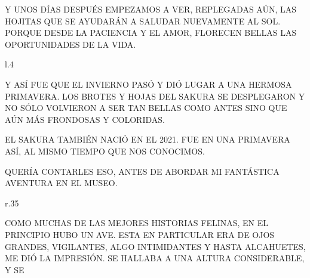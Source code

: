 Y UNOS DÍAS DESPUÉS EMPEZAMOS A VER, REPLEGADAS AÚN, LAS HOJITAS QUE SE AYUDARÁN A SALUDAR NUEVAMENTE AL SOL. PORQUE DESDE LA PACIENCIA Y EL AMOR, FLORECEN BELLAS LAS OPORTUNIDADES DE LA VIDA.
\newpage
{}
\begin{wrapfigure}[13]{l}{.4\textwidth}\vspace{-2cm}\hspace{-3cm}
\end{wrapfigure}
Y ASÍ FUE QUE EL INVIERNO PASÓ Y DIÓ LUGAR A UNA HERMOSA PRIMAVERA. LOS BROTES Y HOJAS DEL SAKURA SE DESPLEGARON Y NO SÓLO VOLVIERON A SER TAN BELLAS COMO ANTES SINO QUE AÚN MÁS FRONDOSAS Y COLORIDAS. 

EL SAKURA TAMBIÉN NACIÓ EN EL 2021. FUE EN UNA PRIMAVERA ASÍ, AL MISMO TIEMPO QUE NOS CONOCIMOS.


QUERÍA CONTARLES ESO, ANTES DE ABORDAR MI FANTÁSTICA AVENTURA EN EL MUSEO.

\newpage
{}
\begin{wrapfigure}[10]{r}{.35\textwidth}\vspace{-1.85cm}%
\end{wrapfigure}
COMO MUCHAS DE LAS MEJORES HISTORIAS FELINAS, EN EL PRINCIPIO HUBO UN AVE. ESTA EN PARTICULAR ERA DE OJOS GRANDES, VIGILANTES, ALGO INTIMIDANTES Y HASTA ALCAHUETES, ME DIÓ LA IMPRESIÓN. SE HALLABA A UNA ALTURA CONSIDERABLE, Y SE 


